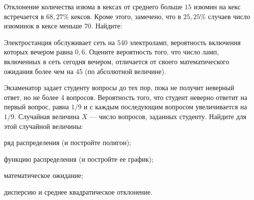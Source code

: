 \vfil

\begin{zkrPlain}{25}\noindent 
	Отклонение количества изюма в кексах от среднего больше $15$ изюмин на кекс встречается в $68{,}27\%$ кексов. Кроме этого, замечено, что в $25{,}25\%$ случаев число изюминок в кексе меньше $70$. Найдите: \par {}
 
\end{zkrPlain}

\vfil

\begin{zkrPlain}{25}\noindent 
	Электростанция обслуживает сеть на $ 540 $ электроламп, вероятность включения которых вечером равна $ 0{,}6 $. Оцените вероятность того, что число ламп, включенных в сеть сегодня вечером, отличается от своего математического ожидания более чем на $ 45 $ (по абсолютной величине). 
 
\end{zkrPlain}

\newpage\setcounter{zad}{0}\setcounter{footnote}{0}



\begin{zkrPlain}{25}\noindent 
	Экзаменатор задает студенту вопросы до тех пор, пока не получит неверный ответ, но не более 4 вопросов. Вероятность того, что студент неверно ответит на первый вопрос, равна $1/9$ и с каждым последующим вопросом увеличивается на $1/9$. Случайная величина $X$ --- число вопросов, заданных студенту.  Найдите для этой случайной величины: \par \smallskip\small{ \par \zz ряд распределения (и постройте полигон); \par \zz функцию распределения (и постройте ее график); \par \zz математическое ожидание; \par \zz дисперсию и среднее квадратическое отклонение.\par \par}
 
\end{zkrPlain}

\vfil

